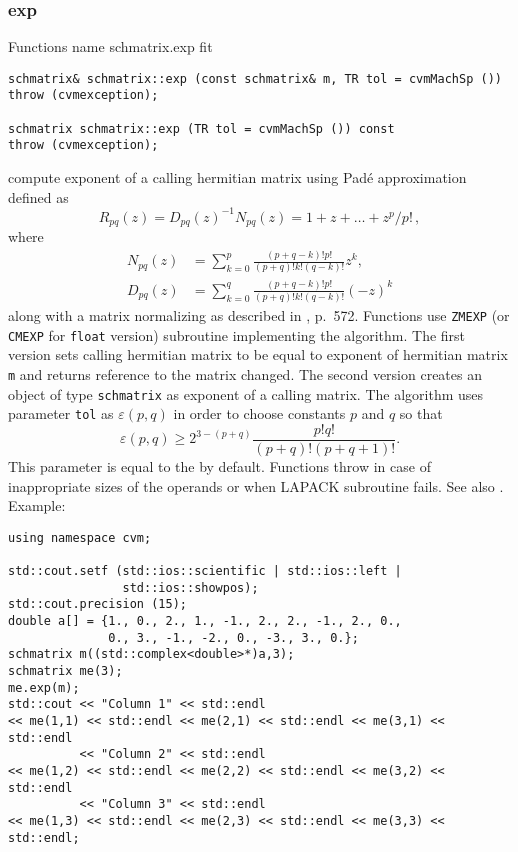 \subsubsection{exp}
Functions%
\pdfdest name {schmatrix.exp} fit
\begin{verbatim}
schmatrix& schmatrix::exp (const schmatrix& m, TR tol = cvmMachSp ())
throw (cvmexception);

schmatrix schmatrix::exp (TR tol = cvmMachSp ()) const
throw (cvmexception);
\end{verbatim}
compute  exponent of a calling hermitian matrix using Pad\'e approximation
defined as
\begin{equation*}
R_{pq}(z)=D_{pq}(z)^{-1}N_{pq}(z)=1+z+\dots+z^p/p!\,,
\end{equation*}
where
\begin{align*}
N_{pq}(z)&=\sum_{k=0}^p\frac{(p+q-k)!p!}{(p+q)!k!(q-k)!}z^k,\\
D_{pq}(z)&=\sum_{k=0}^q\frac{(p+q-k)!p!}{(p+q)!k!(q-k)!}(-z)^k
\end{align*}
along with a matrix normalizing as described in
, p.~572.
Functions use \verb"ZMEXP" (or \verb"CMEXP" for \verb"float" version)
\FORTRAN subroutine implementing the algorithm.
The first version sets  calling hermitian matrix to be equal to
 exponent of  hermitian matrix \verb"m" and returns 
 reference to the matrix
changed. The second version
creates an object of type \verb"schmatrix" as 
exponent of a calling matrix.
The algorithm uses parameter \verb"tol"
as $\varepsilon(p,q)$ in order to choose constants $p$ and $q$
so that
\begin{equation*}
\varepsilon(p,q)\ge 2^{3-(p+q)}\frac{p!q!}{(p+q)!(p+q+1)!}.
\end{equation*}
This parameter is equal to the
 by default.
Functions throw   
in case of
inappropriate sizes of the operands or when LAPACK subroutine fails.
See also
.
Example:
\begin{Verbatim}
using namespace cvm;

std::cout.setf (std::ios::scientific | std::ios::left |
                std::ios::showpos);
std::cout.precision (15);
double a[] = {1., 0., 2., 1., -1., 2., 2., -1., 2., 0.,
              0., 3., -1., -2., 0., -3., 3., 0.};
schmatrix m((std::complex<double>*)a,3);
schmatrix me(3);
me.exp(m);
std::cout << "Column 1" << std::endl
<< me(1,1) << std::endl << me(2,1) << std::endl << me(3,1) << std::endl
          << "Column 2" << std::endl
<< me(1,2) << std::endl << me(2,2) << std::endl << me(3,2) << std::endl
          << "Column 3" << std::endl
<< me(1,3) << std::endl << me(2,3) << std::endl << me(3,3) << std::endl;
\end{Verbatim}

